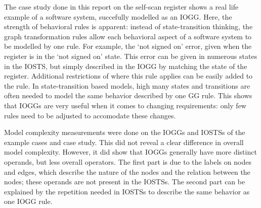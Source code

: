 The case study done in this report on the self-scan register shows a real life example of a software system, succefully modelled as an IOGG. Here, the strength of behavioral rules is apparent: instead of state-transition thinking, the graph transformation rules allow each behavioral aspect of a software system to be modelled by one rule. For example, the `not signed on' error, given when the register is in the `not signed on' state. This error can be given in numerous states in the IOSTS, but simply described in the IOGG by matching the state of the register. Additional restrictions of where this rule applies can be easily added to the rule. In state-transition based models, high many states and transitions are often needed to model the same behavior described by one GG rule. This shows that IOGGs are very useful when it comes to changing requirements: only few rules need to be adjusted to accomodate these changes.

Model complexity measurements were done on the IOGGs and IOSTSs of the example cases and case study. This did not reveal a clear difference in overall model complexity. However, it did show that IOGGs generally have more distinct operands, but less overall operators. The first part is due to the labels on nodes and edges, which describe the nature of the nodes and the relation between the nodes; these operands are not present in the IOSTSs. The second part can be explained by the repetition needed in IOSTSs to describe the same behavior as one IOGG rule.
